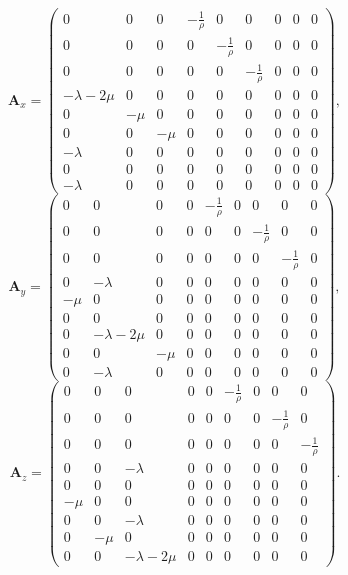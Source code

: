 \documentclass[thesis.tex]{subfiles}
\begin{document}
\begin{small}
\begin{equation}
    \label{изотропная_матрица_x}
    \mathbf A_x = \begin{pmatrix}
    0 & 0 & 0 & -\frac 1 \rho & 0 & 0 & 0 & 0 & 0 \\
    0 & 0 & 0 & 0 & -\frac 1 \rho & 0 & 0 & 0 & 0 \\
    0 & 0 & 0 & 0 & 0 & -\frac 1 \rho & 0 & 0 & 0 \\
    -\lambda-2\mu & 0 & 0 & 0 & 0 & 0 & 0 & 0 & 0 \\
    0 & -\mu & 0 & 0 & 0 & 0 & 0 & 0 & 0 \\
    0 & 0 & -\mu & 0 & 0 & 0 & 0 & 0 & 0 \\
    -\lambda & 0 & 0 & 0 & 0 & 0 & 0 & 0 & 0 \\
    0 & 0 & 0 & 0 & 0 & 0 & 0 & 0 & 0 \\
    -\lambda & 0 & 0 & 0 & 0 & 0 & 0 & 0 & 0
    \end{pmatrix},
\end{equation}
\begin{equation}
    \label{изотропная_матрица_y}
    \mathbf A_y = \begin{pmatrix}
    0 & 0 & 0 & 0 & -\frac 1 \rho & 0 & 0 & 0 & 0 \\
    0 & 0 & 0 & 0 & 0 & 0 & -\frac 1 \rho & 0 & 0 \\
    0 & 0 & 0 & 0 & 0 & 0 & 0 & -\frac 1 \rho & 0 \\
    0 & -\lambda & 0 & 0 & 0 & 0 & 0 & 0 & 0 \\
    -\mu & 0 & 0 & 0 & 0 & 0 & 0 & 0 & 0 \\
    0 & 0 & 0 & 0 & 0 & 0 & 0 & 0 & 0 \\
    0 & -\lambda-2\mu & 0 & 0 & 0 & 0 & 0 & 0 & 0 \\
    0 & 0 & -\mu & 0 & 0 & 0 & 0 & 0 & 0 \\
    0 & -\lambda & 0 & 0 & 0 & 0 & 0 & 0 & 0
    \end{pmatrix},
\end{equation}
\begin{equation}
    \label{изотропная_матрица_z}
    \mathbf A_z = \begin{pmatrix}
    0 & 0 & 0 & 0 & 0 & -\frac 1 \rho & 0 & 0 & 0 \\
    0 & 0 & 0 & 0 & 0 & 0 & 0 & -\frac 1 \rho & 0 \\
    0 & 0 & 0 & 0 & 0 & 0 & 0 & 0  & -\frac 1 \rho \\
    0 & 0 & -\lambda & 0 & 0 & 0 & 0 & 0 & 0 \\
    0 & 0 & 0 & 0 & 0 & 0 & 0 & 0 & 0 \\
    -\mu & 0  & 0 & 0 & 0 & 0 & 0 & 0 & 0 \\
    0 & 0 & -\lambda & 0 & 0 & 0 & 0 & 0 & 0 \\
    0 & -\mu & 0 & 0 & 0 & 0 & 0 & 0 & 0 \\
    0 & 0 & -\lambda-2\mu & 0 & 0 & 0 & 0 & 0 & 0
    \end{pmatrix}. \nonumber
\end{equation}
\end{small}
\end{document}
